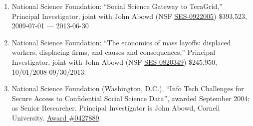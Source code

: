 \documentclass[10pt,letterpaper]{report}
\begin{document}
\begin{enumerate}
\item National Science Foundation: ``Social Science Gateway to TeraGrid,''
Principal Investigator,  joint with John Abowd (NSF \href{http://www.nsf.gov/awardsearch/showAward.do?AwardNumber=0922005}{SES-0922005}) \$393,523,  2009-07-01 --- 2013-06-30

\item National Science Foundation: ``The economics of mass layoffs:
  displaced workers, displacing firms, and causes and consequences,''
  Principal Investigator, joint
  with John Abowd (NSF \href{http://www.nsf.gov/awardsearch/showAward.do?AwardNumber=082034}{SES-0820349}) \$245,950,  10/01/2008-09/30/2013.

\item National Science Foundation (Washington, D.C.),  ``Info
  Tech Challenges for Secure Access to Confidential Social Science Data'',
  awarded September 2004; as Senior Researcher. Principal Investigator is John Abowd, Cornell
  University.   \href{http://www.nsf.gov/awardsearch/showAward.do?AwardNumber=0427889}{Award \#0427889}.
\end{enumerate}
\end{document}
